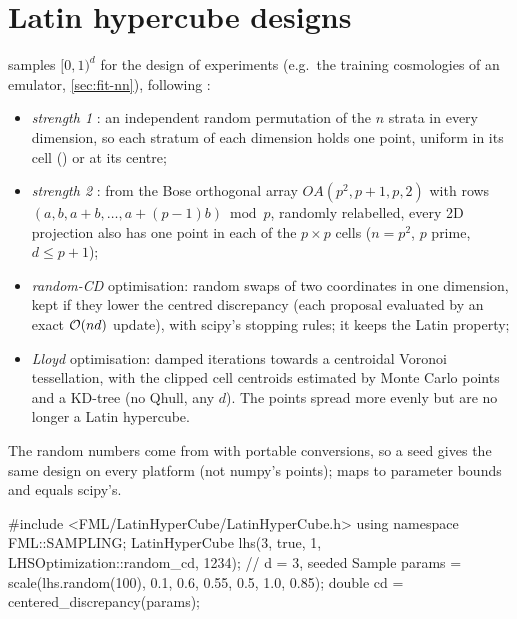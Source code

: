 \section{Latin hypercube designs}\label{sec:num-lhs}

 samples $[0,1)^d$ for the design of experiments (e.g.\ the training cosmologies of an emulator,
\cref{sec:fit-nn}), following :
\begin{itemize}
\item \emph{strength 1} \cite{McKay1979}: an independent random permutation of the $n$ strata in every dimension, so each stratum
      of each dimension holds one point, uniform in its cell () or at its centre;
\item \emph{strength 2} \cite{Tang1993}: from the Bose orthogonal array $OA(p^2,p+1,p,2)$ with rows $(a,b,a+b,\ldots,a+(p-1)b)
      \bmod p$, randomly relabelled, every 2D projection also has one point in each of the $p\times p$ cells ($n=p^2$, $p$ prime,
      $d\le p+1$);
\item \emph{random-CD} optimisation: random swaps of two coordinates in one dimension, kept if they lower the centred
      discrepancy \cite{Hickernell1998} (each proposal evaluated by an exact $\mathcal{O}(nd)$ update), with scipy's stopping rules;
      it keeps the Latin property;
\item \emph{Lloyd} optimisation: damped iterations towards a centroidal Voronoi tessellation, with the clipped cell centroids
      estimated by Monte Carlo points and a KD-tree (no Qhull, any $d$). The points spread more evenly but are no longer a Latin
      hypercube.
\end{itemize}
The random numbers come from  with portable conversions, so a seed gives the same design on every
platform (not numpy's points);  maps to parameter bounds and  equals scipy's.

\begin{cppcode}
#include <FML/LatinHyperCube/LatinHyperCube.h>
using namespace FML::SAMPLING;
LatinHyperCube lhs(3, true, 1, LHSOptimization::random_cd, 1234);   // d = 3, seeded
Sample params = scale(lhs.random(100), {0.1, 0.6, 0.55}, {0.5, 1.0, 0.85});
double cd = centered_discrepancy(params);
\end{cppcode}
